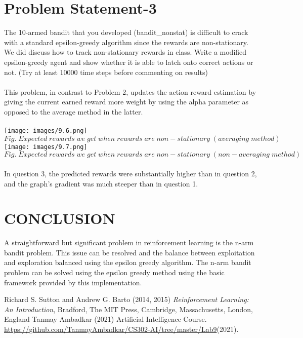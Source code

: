 \documentclass[conference]{IEEEtran}
\begin{document}
\section{Problem Statement-3} 
The 10-armed bandit that you developed (bandit\_nonstat) is difficult to crack with a standard epsilon-greedy algorithm since the rewards are non-stationary.  We did discuss how to track non-stationary rewards in class.  Write a modified epsilon-greedy agent and show whether it is able to latch onto correct actions or not.  (Try at least 10000 time steps before commenting on results)\\ 
\\
This problem, in contrast to Problem 2, updates the action reward estimation by giving the current earned reward more weight by using the alpha parameter as opposed to the average method in the latter.\\  \\
\texttt{[image: images/9.6.png]}
$Fig. \; Expected \; rewards \; we \; get \; when \; rewards \; are \; non-stationary\; (averaging\; method)$
\texttt{[image: images/9.7.png]}
$Fig. \; Expected \; rewards \; we \; get \; when \; rewards \; are \; non-stationary \; (non-averaging \; method)$ \\ \\
In question 3, the predicted rewards were substantially higher than in question 2, and the graph's gradient was much steeper than in question 1. 
\section{CONCLUSION}
A straightforward but significant problem in reinforcement learning is the n-arm bandit problem. This issue can be resolved and the balance between exploitation and exploration balanced using the epsilon greedy algorithm. The n-arm bandit problem can be solved using the epsilon greedy method using the basic framework provided by this implementation.
\begin{thebibliography}{}
\bibitem{}
Richard S. Sutton and Andrew G. Barto (2014, 2015) \emph{Reinforcement Learning: An Introduction}, Bradford, The MIT Press, Cambridge, Massachusetts, London, England
\bibitem{}
Tanmay Ambadkar (2021) Artificial Intelligence Course. \href{https://github.com/TanmayAmbadkar/CS302-AI/tree/master/Lab9}{https://github.com/TanmayAmbadkar/CS302-AI/tree/master/Lab9}(2021).
\end{thebibliography}
\end{document}
